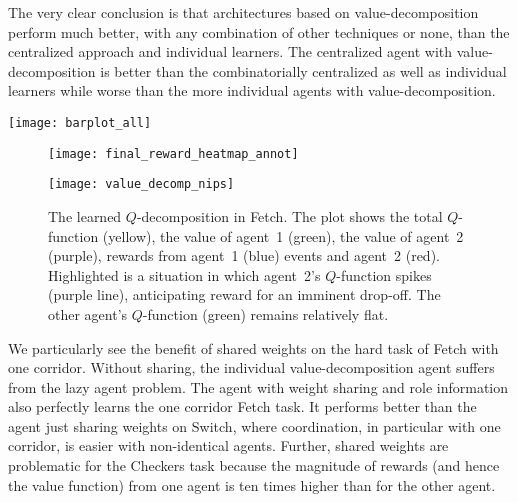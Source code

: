 \documentclass{article}
\begin{document}
\begin{SCfigure}
The very clear conclusion is that architectures based on value-decomposition perform much better, with any combination of other techniques or none, than the centralized approach and individual learners. The centralized agent with value-decomposition is better than the combinatorially centralized as well as individual learners while worse than the more individual agents with value-decomposition. 



\begin{figure*}[t]
\texttt{[image: barplot\_all]}
\caption{Barplots showing normalized AUC for each agent and domain over 50000 episodes of training and the mean across domains.}\label{barplot_all}
\end{figure*}


 
 
 \begin{figure}
\begin{minipage}{.5\textwidth}
\texttt{[image: final\_reward\_heatmap\_annot]}
\caption{Heatmap showing each agent's final performance, averaged over the last 5,000 episodes of 50,000 and across ten runs, normalized by the best architecture per task. The agents are ordered according to average over the domains, which can be seen in the right most column. Value-Decomposition architecture strongly outperform Individual Learners and Centralization} \label{heat}

\end{minipage}
\begin{minipage}{.5\textwidth}
\texttt{[image: value\_decomp\_nips]}
\caption{The learned $Q$-decomposition in Fetch. The plot shows the total $Q$-function (yellow), the value of agent~1 (green), the value of agent~2 (purple), rewards from agent~1 (blue) events and agent~2 (red). Highlighted is a situation in which agent~2's $Q$-function spikes (purple line), anticipating reward for an imminent drop-off. The other agent's $Q$-function (green) remains relatively flat.}\label{Qplot}
\end{minipage}

\end{figure}
 
 
We particularly see the benefit of shared weights on the hard task of Fetch with one corridor. Without sharing, the individual value-decomposition agent suffers from the lazy agent problem.  The agent with weight sharing and role information also perfectly learns the one corridor Fetch task. It performs better than the agent just sharing weights on Switch, where coordination, in particular with one corridor, is easier with non-identical agents. Further, shared weights are problematic for the Checkers task because the magnitude of rewards (and hence the value function) from one agent is ten times higher than for the other agent. 


\end{SCfigure}
\end{document}
